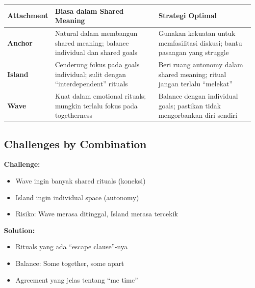 \begin{center}
\renewcommand{\arraystretch}{1.7}
\begin{tabular}{|>{\raggedright}p{2.5cm}|>{\raggedright}p{5cm}|>{\raggedright}p{5cm}|}
\hline
\rowcolor{primary!20}
\textbf{Attachment} & \textbf{Biasa dalam Shared Meaning} & \textbf{Strategi Optimal} \\
\hline
\textbf{Anchor} & Natural dalam membangun shared meaning; balance individual dan shared goals & Gunakan kekuatan untuk memfasilitasi diskusi; bantu pasangan yang struggle \\
\hline
\textbf{Island} & Cenderung fokus pada goals individual; sulit dengan ``interdependent'' rituals & Beri ruang autonomy dalam shared meaning; ritual jangan terlalu ``melekat'' \\
\hline
\textbf{Wave} & Kuat dalam emotional rituals; mungkin terlalu fokus pada togetherness & Balance dengan individual goals; pastikan tidak mengorbankan diri sendiri \\
\hline
\end{tabular}
\end{center}

\subsection{Challenges by Combination}

\begin{praktikbox}
\textbf{Challenge:}
\begin{itemize}
    \item Wave ingin banyak shared rituals (koneksi)
    \item Island ingin individual space (autonomy)
    \item Risiko: Wave merasa ditinggal, Island merasa tercekik
\end{itemize}

\textbf{Solution:}
\begin{itemize}
    \item Rituals yang ada ``escape clause''-nya
    \item Balance: Some together, some apart
    \item Agreement yang jelas tentang ``me time''
\end{itemize}
\end{praktikbox}

